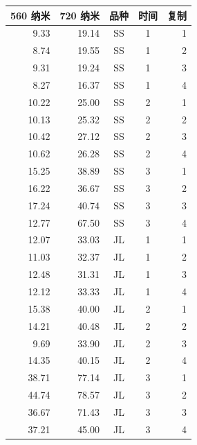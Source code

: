 \begin{mvtable}
\label{tab:6.18}
\begin{tabular}{rrccr}
\toprule
560 纳米 & 720 纳米 & 品种 & 时间 & 复制\\\midrule
9.33 & 19.14 & SS & 1 & 1\\
8.74 & 19.55 & SS & 1 & 2\\
9.31 & 19.24 & SS & 1 & 3\\
8.27 & 16.37 & SS & 1 & 4\\
10.22 & 25.00 & SS & 2 & 1\\
10.13 & 25.32 & SS & 2 & 2\\
10.42 & 27.12 & SS & 2 & 3\\
10.62 & 26.28 & SS & 2 & 4\\
15.25 & 38.89 & SS & 3 & 1\\
16.22 & 36.67 & SS & 3 & 2\\
17.24 & 40.74 & SS & 3 & 3\\
12.77 & 67.50 & SS & 3 & 4\\
12.07 & 33.03 & JL & 1 & 1\\
11.03 & 32.37 & JL & 1 & 2\\
12.48 & 31.31 & JL & 1 & 3\\
12.12 & 33.33 & JL & 1 & 4\\
15.38 & 40.00 & JL & 2 & 1\\
14.21 & 40.48 & JL & 2 & 2\\
9.69 & 33.90 & JL & 2 & 3\\
14.35 & 40.15 & JL & 2 & 4\\
38.71 & 77.14 & JL & 3 & 1\\
44.74 & 78.57 & JL & 3 & 2\\
36.67 & 71.43 & JL & 3 & 3\\
37.21 & 45.00 & JL & 3 & 4\\
\bottomrule
\end{tabular}
\end{mvtable}
